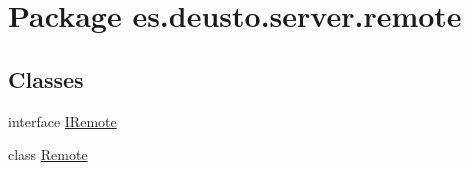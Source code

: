 \hypertarget{namespacees_1_1deusto_1_1server_1_1remote}{}\section{Package es.\+deusto.\+server.\+remote}
\label{namespacees_1_1deusto_1_1server_1_1remote}
\subsection*{Classes}
\begin{DoxyCompactItemize}
\item 
interface \hyperlink{interfacees_1_1deusto_1_1server_1_1remote_1_1_i_remote}{I\+Remote}
\item 
class \hyperlink{classes_1_1deusto_1_1server_1_1remote_1_1_remote}{Remote}
\end{DoxyCompactItemize}
